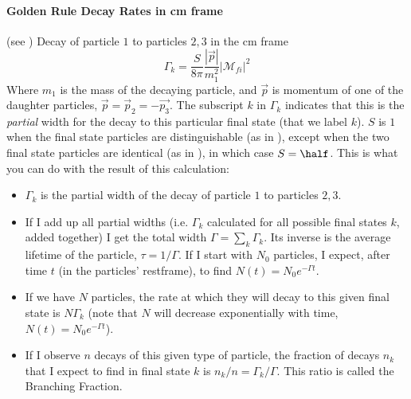 \paragraph{Golden Rule Decay Rates in cm frame}
(see )
Decay of particle $1$ to particles $2, 3$ in the cm frame 
\begin{equation}
\Gamma_k = \frac{S}{8\pi} \frac{|\vec{p}|}{m_1^2} \left|\mathcal{M}_{fi}\right|^2
\end{equation}
Where $m_1$ is the mass of the decaying particle, and $\vec{p}$ is momentum of one of the daughter particles, $\vec{p} = \vec{p}_2 = -\vec{p_3}$. The subscript $k$ in $\Gamma_k$ indicates that this is the \emph{partial} width for the decay to this particular final state (that we label $k$). $S$ is $1$ when the final state particles are distinguishable (as in \prt{\pi^+ \to \mu^+ \nu_{\mu}}), except when the two final state particles are identical (as in \prt{\pi^0 \to \gamma \gamma}), in which case $S = \half$.
This is what you can do with the result of this calculation:
\begin{itemize}
\item $\Gamma_k$ is the partial width of the decay of particle $1$ to particles $2, 3$.
\item If I add up all partial widths (i.e. $\Gamma_k$ calculated for all possible final states $k$, added together) I get the total width $\Gamma = \sum_k \Gamma_k$. Its inverse is the average lifetime of the particle, $\tau = 1/\Gamma$. If I start with $N_0$ particles, I expect, after time $t$ (in the particles' restframe), to find $N(t) = N_0 e^{-\Gamma t}$.
\item If we have $N$ particles, the rate at which they will decay to this given final state is $N\Gamma_k$ (note that $N$ will decrease exponentially with time, $N(t) = N_0 e^{-\Gamma t}$).
\item If I observe $n$ decays of this given type of particle, the fraction of decays $n_k$ that I expect to find in final state $k$ is $n_k/n = \Gamma_k/\Gamma$. This ratio is called the Branching Fraction.
\end{itemize}


